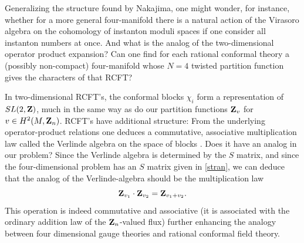 \documentclass[12pt]{article}
\numberwithin{equation}{section}
\begin{document}
Generalizing the structure found by Nakajima,
one might wonder, for instance, whether for a more general four-manifold
there is
a natural action of the Virasoro algebra on the cohomology
of instanton  moduli spaces if one consider all instanton numbers
at once.  And what is the analog of the two-dimensional operator
product expansion?  Can one find for each rational conformal
theory a (possibly non-compact) four-manifold  whose
$N=4$ twisted partition function gives the characters of that RCFT?

In two-dimensional RCFT's,
the conformal blocks $\chi_i$ form a representation
of $SL(2,{\bf Z})$, much in the same way as do our partition functions
${\bf Z}_v$ for $v\in H^2(M,{\bf Z}_n)$.  RCFT's have additional
structure:  From the underlying operator-product relations
one deduces a commutative, associative multiplication law called the Verlinde
algebra
on the space of blocks  \cite{ver}.
Does it have an analog in our problem?
Since the Verlinde algebra is determined by the $S$ matrix, and since
the four-dimensional problem has an  $S$ matrix given in \eqref{stran},
we can deduce that the analog of the Verlinde-algebra should be the
multiplication law
%
$${\bf Z}_{v_1}\cdot {\bf Z}_{v_2}={\bf Z}_{v_1+v_2}.$$
%
This operation is indeed commutative and  associative
(it is associated with
the ordinary addition law of the ${\bf Z}_n$-valued flux)
further enhancing the analogy between four dimensional gauge
theories and rational conformal field theory.

\bigskip
{}
\end{document}
